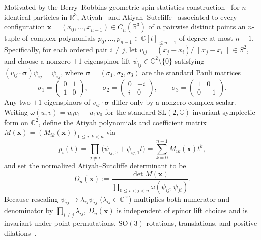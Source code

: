 \documentclass[11pt,reqno]{amsart}
\theoremstyle{remark}
\newcommand{\R}{\mathbb{R}}
\newcommand{\C}{\mathbb{C}}
\begin{document}
Motivated by the Berry--Robbins geometric spin-statistics construction~\cite{BerryRobbins1997} for $n$ identical particles in $\R^3$, Atiyah~\cite{Atiyah2001} and Atiyah--Sutcliffe~\cite{AtiyahSutcliffe2002} associated to every configuration $\mathbf{x} = (x_0, \dots, x_{n-1}) \in C_n(\R^3)$ of $n$ pairwise distinct points an $n$-tuple of complex polynomials $p_0, \dots, p_{n-1} \in \C[t]_{\le n-1}$ of degree at most $n - 1$.
Specifically, for each ordered pair $i \ne j$, let $v_{ij} = (x_j - x_i)/\|x_j - x_i\| \in S^2$, and choose a nonzero $+1$-eigenspinor lift $\psi_{ij} \in \C^2 \setminus \{0\}$ satisfying $(v_{ij} \cdot \boldsymbol{\sigma})\psi_{ij} = \psi_{ij}$, where $\boldsymbol{\sigma} = (\sigma_1, \sigma_2, \sigma_3)$ are the standard Pauli matrices
\[
  \sigma_1 = \begin{pmatrix} 0 & 1 \\ 1 & 0 \end{pmatrix}, \qquad
  \sigma_2 = \begin{pmatrix} 0 & -i \\ i & 0 \end{pmatrix}, \qquad
  \sigma_3 = \begin{pmatrix} 1 & 0 \\ 0 & -1 \end{pmatrix}.
\]
Any two $+1$-eigenspinors of $v_{ij} \cdot \boldsymbol{\sigma}$ differ only by a nonzero complex scalar.
Writing $\omega(u, v) = u_0 v_1 - u_1 v_0$ for the standard $\mathrm{SL}(2, \C)$-invariant symplectic form on $\C^2$, define the Atiyah polynomials and coefficient matrix $M(\mathbf{x}) = (M_{ik}(\mathbf{x}))_{0 \le i,k < n}$ via
\[
  p_i(t) = \prod_{j \ne i} \bigl(\psi_{ij,0} + \psi_{ij,1} t\bigr) = \sum_{k=0}^{n-1} M_{ik}(\mathbf{x}) t^k,
\]
and set the normalized Atiyah--Sutcliffe determinant to be
\begin{equation}\label{eq:def-Dn}
  D_n(\mathbf{x}) := \frac{\det M(\mathbf{x})}{\prod_{0 \le i < j < n} \omega(\psi_{ij}, \psi_{ji})}.
\end{equation}
Because rescaling $\psi_{ij} \mapsto \lambda_{ij}\psi_{ij}$ ($\lambda_{ij} \in \C^\times$) multiplies both numerator and denominator by $\prod_{i \ne j} \lambda_{ij}$, $D_n(\mathbf{x})$ is independent of spinor lift choices and is invariant under point permutations, $\mathrm{SO}(3)$ rotations, translations, and positive dilations~\cite{AtiyahSutcliffe2002}.
\end{document}
